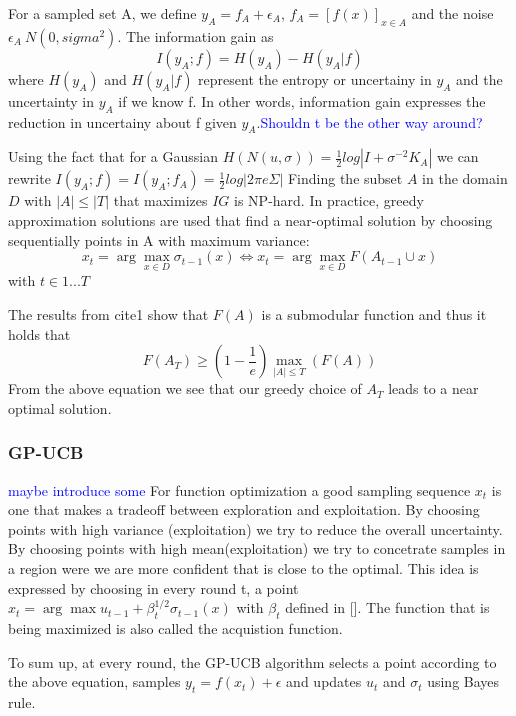 \documentclass[10pt,journal,a4paper]{IEEEtran}
\begin{document}
For a sampled set A, we define $y_A = f_A + \epsilon_A$, $f_A=[f(x)]_{x \in A}$ and the noise $\epsilon_A ~ N(0,sigma^2)$.
 The information gain as
\begin{equation}
	I(y_A; f) = H(y_A) - H(y_A| f)
\end{equation}
where $H(y_A)$ and $H(y_A|f)$ represent the entropy or uncertainy in $y_A$ and 
the uncertainty in $y_A$ if we know f. In other words, information gain expresses the reduction in uncertainy about f given $y_A$.\textcolor{blue}{Shouldn t be the other way around?}

Using the fact that for a Gaussian $H(N(u,\sigma)) = \frac{1}{2} log|I + \sigma^{-2} K_A|$ we can rewrite $I(y_A; f)  = 	I(y_A; f_A) = \frac{1}{2}log|2\pi e \Sigma| $
Finding the subset $A$ in the domain $D$ with $|A| \leq |T|$ that maximizes $IG$ is NP-hard. In practice, greedy approximation solutions are used that find a near-optimal solution by choosing sequentially points in A with maximum variance:
\begin{equation}
	x_t = \arg\max_{x\in D}\sigma_{t-1}(x) \Longleftrightarrow x_t = \arg\max_{x\in D} F(A_{t-1}\cup {x})
\end{equation}
with $t\in{1...T}$

The results from cite1 show that $F(A)$ is a submodular function and thus it holds that
\begin{equation}
	F(A_T) \geq (1-\frac{1}{e}) \max_{|A| \leq T}(F(A))
\end{equation}
From the above equation we see that our greedy choice of $A_T$ leads to a near optimal solution.

\subsubsection{GP-UCB}
\textcolor{blue}{maybe introduce some}
For function optimization a good sampling sequence $x_t$ is one that makes a tradeoff between 
exploration and exploitation. By choosing points with high variance (exploitation) we try to reduce the overall uncertainty.
By choosing points with high mean(exploitation) we try to concetrate samples in a region were we are  more confident that is close to the optimal. This idea is expressed by choosing in every round t, a point $x_t = \arg\max u_{t-1} + \beta_{t}^{1/2}\sigma_{t-1}(x)$ with $\beta_{t}$ defined in []. The function that is being maximized is also called the acquistion function.

To sum up, at every round, the GP-UCB algorithm selects a point according to the above equation, samples $y_t=f(x_t) + \epsilon$ and updates $u_t$ and $\sigma_t$ using Bayes rule.
\end{document}

